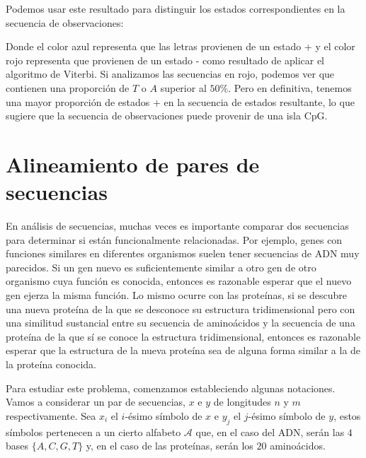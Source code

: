 Podemos usar este resultado para distinguir los estados correspondientes en la secuencia de observaciones:

\textcolor{blue}{}\textcolor{red}{}\textcolor{blue}{}\textcolor{red}{}\textcolor{blue}{}\textcolor{red}{}\textcolor{blue}{}\textcolor{red}{}\textcolor{blue}{}\textcolor{red}{}\textcolor{blue}{}

Donde el color azul representa que las letras provienen de un estado + y el color rojo representa que provienen de un estado - como resultado de aplicar el algoritmo de Viterbi. Si analizamos las secuencias en rojo, podemos ver que contienen una proporción de $T$ o $A$ superior al $50\%$. Pero en definitiva, tenemos una mayor proporción de estados + en la secuencia de estados resultante, lo que sugiere que la secuencia de observaciones puede provenir de una isla CpG.

\section{Alineamiento de pares de secuencias}
En análisis de secuencias, muchas veces es importante comparar dos secuencias para determinar si están funcionalmente relacionadas. Por ejemplo, genes con funciones similares en diferentes organismos suelen tener secuencias de ADN muy parecidos. Si un gen nuevo es suficientemente similar a otro gen de otro organismo cuya función es conocida, entonces es razonable esperar que el nuevo gen ejerza la misma función. Lo mismo ocurre con las proteínas, si se descubre una nueva proteína de la que se desconoce su estructura tridimensional pero con una similitud sustancial entre su secuencia de aminoácidos y la secuencia de una proteína de la que sí se conoce la estructura tridimensional, entonces es razonable esperar que la estructura de la nueva proteína sea de alguna forma similar a la de la proteína conocida.

Para estudiar este problema, comenzamos estableciendo algunas notaciones. Vamos a considerar un par de secuencias, $x$ e $y$ de longitudes $n$ y $m$ respectivamente. Sea $x_i$ el $i$-ésimo símbolo de $x$ e $y_j$ el $j$-ésimo símbolo de $y$, estos símbolos pertenecen a un cierto alfabeto $\mathcal{A}$ que, en el caso del ADN, serán las $4$ bases $\{A,C,G,T\}$ y, en el caso de las proteínas, serán los $20$ aminoácidos.

